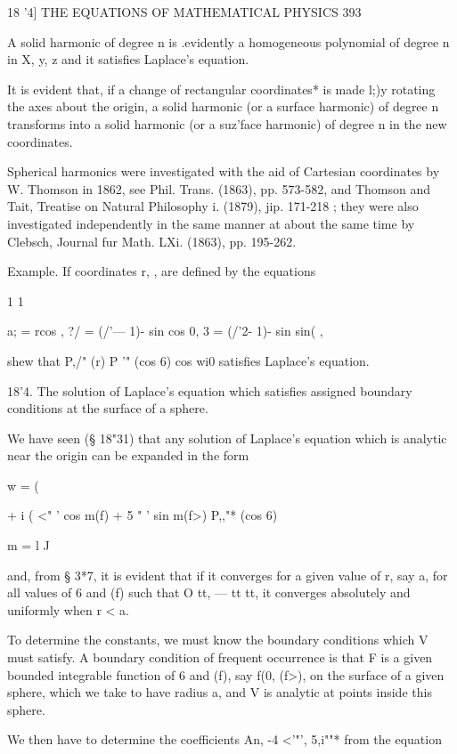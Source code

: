 18 '4] THE EQUATIONS OF MATHEMATICAL PHYSICS 393

A solid harmonic of degree n is .evidently a homogeneous polynomial of
degree n in X, y, z and it satisfies Laplace's equation.

It is evident that, if a change of rectangular coordinates* is made
l;)y rotating the axes about the origin, a solid harmonic (or a
surface harmonic) of degree n transforms into a solid harmonic (or a
suz'face harmonic) of degree n in the new coordinates.

Spherical harmonics were investigated with the aid of Cartesian
coordinates by W. Thomson in 1862, see Phil. Trans. (1863), pp.
573-582, and Thomson and Tait, Treatise on Natural Philosophy i.
(1879), jip. 171-218 ; they were also investigated independently in
the same manner at about the same time by Clebsch, Journal fur Math.
LXi. (1863), pp. 195-262.

Example. If coordinates r, , are defined by the equations

1 1

a; = rcos , ?/ = (/'— 1)- sin cos 0, 3 = (/'2- 1)- sin sin( ,

shew that P,/" (r) P '" (cos 6) cos wi0 satisfies Laplace's equation.

18'4. The solution of Laplace's equation which satisfies assigned
boundary conditions at the surface of a sphere.

We have seen (§ 18"31) that any solution of Laplace's equation which
is analytic near the origin can be expanded in the form



w = (

+ i ( <" ' cos m(f) + 5 " ' sin m(f>) P,,"* (cos 6) \

m = l J

and, from § 3*7, it is evident that if it converges for a given value
of r, say a, for all values of 6 and (f) such that O tt, — tt tt, it
converges absolutely and uniformly when r < a.

To determine the constants, we must know the boundary conditions which
V must satisfy. A boundary condition of frequent occurrence is that F
is a given bounded integrable function of 6 and (f), say f(0, (f>), on
the surface of a given sphere, which we take to have radius a, and V
is analytic at points inside this sphere.

We then have to determine the coefficients An, -4 <'"', 5,i""* from
the equation



